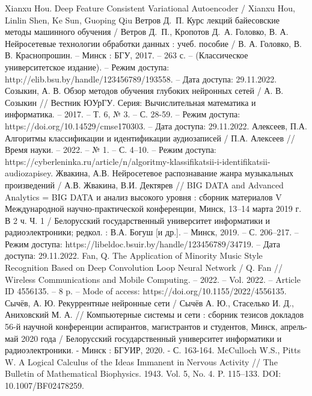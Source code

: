 \begin{thebibliography}{99}
 Xianxu Hou. Deep Feature Consistent Variational Autoencoder / Xianxu Hou, Linlin Shen, Ke Sun, Guoping Qiu
 Ветров Д.~П. Курс лекций байесовские методы машинного обучения / Ветров Д.~П., Кропотов Д.~А.
 Головко, В. А. Нейросетевые технологии обработки данных : учеб. пособие / В. А. Головко, В. В. Краснопрошин. – Минск : БГУ, 2017. – 263 с. – (Классическое университетское издание). – Режим доступа: http://elib.bsu.by/handle/123456789/193558. -- Дата доступа: 29.11.2022.
 Созыкин, А. В. Обзор методов обучения глубоких нейронных сетей / А. В. Созыкин // Вестник ЮУрГУ. Серия: Вычислительная математика и информатика. – 2017. – Т. 6, № 3. – С. 28-59. – Режим доступа: https://doi.org/10.14529/cmse170303. -- Дата доступа: 29.11.2022.
 Алексеев, П.А. Алгоритмы классификации и идентификации аудиозаписей / П.А. Алексеев // Время науки. – 2022. – № 1. – С. 4–10. – Режим доступа: https://cyberleninka.ru/article/n/algoritmy-klassifikatsii-i-identifikatsii-audiozapisey.
 Жвакина, А.В. Нейросетевое распознавание жанра музыкальных произведений / А.В.  Жвакина, В.И. Дектярев // BIG DATA and Advanced Analytics = BIG DATA и анализ высокого уровня : сборник материалов V Международной научно-практической конференции, Минск, 13–14 марта 2019 г. В 2 ч. Ч. 1 / Белорусский государственный университет информатики и радиоэлектроники; редкол. : В.А. Богуш [и др.]. – Минск, 2019. – С. 206–217. – Режим доступа: https://libeldoc.bsuir.by/handle/123456789/34719. -- Дата доступа: 29.11.2022.
 Fan, Q. The Application of Minority Music Style Recognition Based on Deep Convolution Loop Neural Network / Q. Fan // Wireless Communications and Mobile Computing. – 2022. – Vol. 2022. – Article ID 4556135. – 8 p. – Mode of access: https://doi.org/10.1155/2022/4556135.
 Сычёв, А. Ю. Рекуррентные нейронные сети / Сычёв А. Ю., Стаселько И. Д., Аниховский М. А. // Компьютерные системы и сети : сборник тезисов докладов 56-й научной конференции аспирантов, магистрантов и студентов, Минск, апрель-май 2020 года / Белорусский государственный университет информатики и радиоэлектроники. - Минск : БГУИР, 2020. - С. 163-164.
 McCulloch W.S., Pitts W. A Logical Calculus of the Ideas Immanent in Nervous Activity // The Bulletin of Mathematical Biophysics. 1943. Vol. 5, No. 4. P. 115–133.  DOI: 10.1007/BF02478259.

\end{thebibliography}
